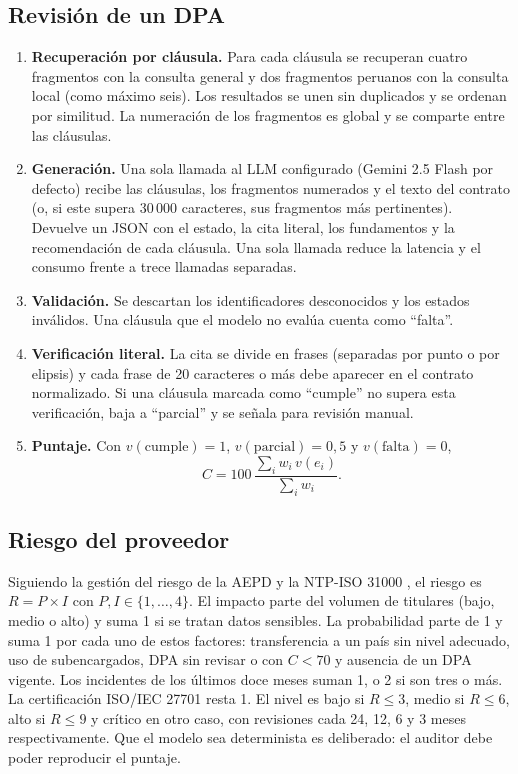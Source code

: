 \documentclass[conference]{IEEEtran}
\begin{document}
\subsection{Revisión de un DPA}
\begin{enumerate}
  \item \textbf{Recuperación por cláusula.} Para cada cláusula se recuperan cuatro fragmentos con la consulta general y dos fragmentos peruanos con la consulta local (como máximo seis). Los resultados se unen sin duplicados y se ordenan por similitud. La numeración de los fragmentos es global y se comparte entre las cláusulas.
  \item \textbf{Generación.} Una sola llamada al LLM configurado (Gemini 2.5 Flash \cite{gemini25} por defecto) recibe las cláusulas, los fragmentos numerados y el texto del contrato (o, si este supera 30\,000 caracteres, sus fragmentos más pertinentes). Devuelve un JSON con el estado, la cita literal, los fundamentos y la recomendación de cada cláusula. Una sola llamada reduce la latencia y el consumo frente a trece llamadas separadas.
  \item \textbf{Validación.} Se descartan los identificadores desconocidos y los estados inválidos. Una cláusula que el modelo no evalúa cuenta como ``falta''.
  \item \textbf{Verificación literal.} La cita se divide en frases (separadas por punto o por elipsis) y cada frase de 20 caracteres o más debe aparecer en el contrato normalizado. Si una cláusula marcada como ``cumple'' no supera esta verificación, baja a ``parcial'' y se señala para revisión manual.
  \item \textbf{Puntaje.} Con $v(\text{cumple})=1$, $v(\text{parcial})=0{,}5$ y $v(\text{falta})=0$,
  \begin{equation}
    C = 100\,\frac{\sum_i w_i\, v(e_i)}{\sum_i w_i}.
  \end{equation}
\end{enumerate}

\subsection{Riesgo del proveedor}
Siguiendo la gestión del riesgo de la AEPD y la NTP-ISO 31000 \cite{aepd2021,ntp31000}, el riesgo es $R = P \times I$ con $P, I \in \{1,\dots,4\}$. El impacto parte del volumen de titulares (bajo, medio o alto) y suma 1 si se tratan datos sensibles. La probabilidad parte de 1 y suma 1 por cada uno de estos factores: transferencia a un país sin nivel adecuado, uso de subencargados, DPA sin revisar o con $C<70$ y ausencia de un DPA vigente. Los incidentes de los últimos doce meses suman 1, o 2 si son tres o más. La certificación ISO/IEC 27701 resta 1. El nivel es bajo si $R\le3$, medio si $R\le6$, alto si $R\le9$ y crítico en otro caso, con revisiones cada 24, 12, 6 y 3 meses respectivamente. Que el modelo sea determinista es deliberado: el auditor debe poder reproducir el puntaje.
\end{document}
